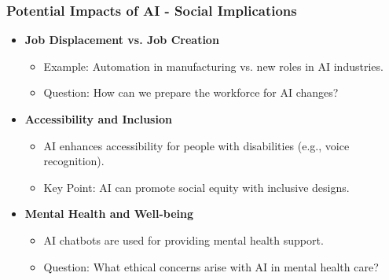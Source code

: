 \documentclass[aspectratio=169]{beamer}
\begin{document}
\begin{frame}[fragile]
    \frametitle{Potential Impacts of AI - Social Implications}
    \begin{itemize}
        \item \textbf{Job Displacement vs. Job Creation}
            \begin{itemize}
                \item Example: Automation in manufacturing vs. new roles in AI industries.
                \item Question: How can we prepare the workforce for AI changes?
            \end{itemize}
        \item \textbf{Accessibility and Inclusion}
            \begin{itemize}
                \item AI enhances accessibility for people with disabilities (e.g., voice recognition).
                \item Key Point: AI can promote social equity with inclusive designs.
            \end{itemize}
        \item \textbf{Mental Health and Well-being}
            \begin{itemize}
                \item AI chatbots are used for providing mental health support.
                \item Question: What ethical concerns arise with AI in mental health care?
            \end{itemize}
    \end{itemize}
\end{frame}
\end{document}

